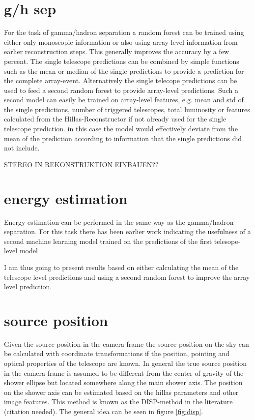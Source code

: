 \section{g/h sep}
For the task of gamma/hadron separation a random forest can be trained
using either only monoscopic information or also using array-level
information from earlier reconstruction steps.
This generally improves the accuracy by a few percent.
The single telescope predictions can be combined by
simple functions such as the mean or median of the
single predictions to provide a prediction for the complete
array-event.
Alternatively the single telecope predictions can be used to
feed a second random forest to provide array-level predictions.
Such a second model can easily be trained on array-level
features, e.g. mean and std of the single predictions, number of triggered
telescopes, total luminosity or features calculated from the
Hillas-Reconstructor if not already used for the single telescope
prediction. in this case the model would effectively deviate
from the mean of the prediction according to information that the
single predictions did not include.


STEREO IN REKONSTRUKTION EINBAUEN??


\section{energy estimation}
Energy estimation can be performed in the same way as the gamma/hadron
separation. For this task there has been earlier work indicating
the usefulness of a second machine learning model trained
on the predictions of the first telesope-level model
\cite{ba-lars}.

I am thus going to present results based on either calculating the mean
of the telescope level predictions and using a second random forest
to improve the array level prediction.

\section{source position}
\label{sec:source_position}
Given the source position in the camera frame the source position
on the sky can be calculated with coordinate transformations if
the position, pointing and optical properties of the
telescope are known.
In general the true source position in the camera frame is assumed to be
different from the center of gravity of the shower ellipse
but located somewhere along the main shower axis.
The position on the shower axis can be estimated based on 
the hillas parameters and other image features.
This method is known as the DISP-method in the
literature (citation needed). The general idea 
can be seen in figure \ref{fig:disp}.

